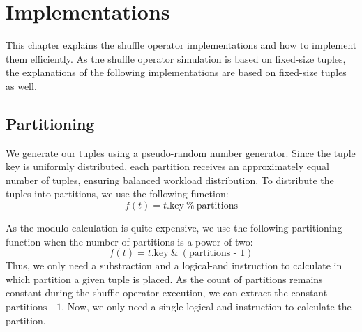 
\chapter{Implementations}\label{chapter:implementations}\acresetall
This chapter explains the shuffle operator implementations and how to implement them efficiently.
As the shuffle operator simulation is based on fixed-size tuples, the explanations of the following implementations are based on fixed-size tuples as well.

\section{Partitioning}\label{sec-partitioning}
We generate our tuples using a pseudo-random number generator.
Since the tuple key is uniformly distributed, each partition receives an approximately equal number of tuples, ensuring balanced workload distribution.
To distribute the tuples into partitions, we use the following function:
\begin{equation}
  f(t) = t\textrm{.key}\ \%\ \textrm{partitions}
\end{equation}

As the modulo calculation is quite expensive, we use the following partitioning function when the number of partitions is a power of two:
\begin{equation}
  f(t) = t\textrm{.key}\ \&\ (\textrm{partitions - 1})
\end{equation}
Thus, we only need a substraction and a logical-and instruction to calculate in which partition a given tuple is placed.
As the count of partitions remains constant during the shuffle operator execution, we can extract the constant $\textrm{partitions - 1}$.
Now, we only need a single logical-and instruction to calculate the partition.
